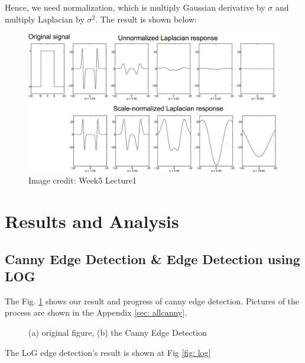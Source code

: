 \documentclass[final]{cvpr}
\begin{document}
Hence, we need normalization, which is multiply Gaussian derivative by $\sigma$ and multiply Laplacian by $\sigma^2$. The result is shown below:
\begin{figure}[htbp]
\centering

\includegraphics[width=1\linewidth]{2.png}

\caption{Image credit: Week5 Lecture1}

\end{figure}


\section{Results and Analysis}

\subsection{Canny Edge Detection \& Edge Detection using LOG}
The Fig. \ref{fig:canny} shows our result and progress of canny edge detection. Pictures of the process are shown in the Appendix \ref{sec: allcanny}.

\begin{figure}[h]
\centering
{}
\quad
{}
\caption{(a) original figure, (b) the Canny Edge Detection}
\label{fig:canny}
\end{figure}
The LoG edge detection's result is shown at Fig \ref{fig: log}
\end{document}
